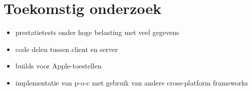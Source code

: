 \documentclass[a0,portrait]{hogent-poster}
\begin{document}
\begin{multicols}{2}
\begin{itemize}
\end{itemize}

\section{Toekomstig onderzoek}

\begin{itemize}
    \item prestatietests onder hoge belasting met veel gegevens
    \item code delen tussen client en server
    \item builds voor Apple-toestellen
    \item implementatie van p-o-c met gebruik van andere cross-platform frameworks
\end{itemize}

\end{multicols}
\end{document}
